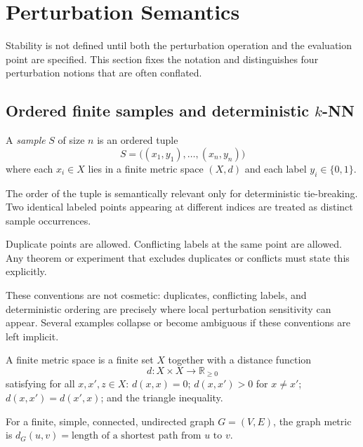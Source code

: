 \section{Perturbation Semantics}
\label{sec:perturbation-semantics}

Stability is not defined until both the perturbation operation and the
evaluation point are specified.  This section fixes the notation and
distinguishes four perturbation notions that are often conflated.

\subsection{Ordered finite samples and deterministic $k$-NN}

\begin{definition}[Sample]
A \emph{sample} $S$ of size $n$ is an ordered tuple
\[
S = \big((x_1, y_1), \ldots, (x_n, y_n)\big)
\]
where each $x_i \in X$ lies in a finite metric space $(X, d)$ and each label
$y_i \in \{0, 1\}$.
\end{definition}

The order of the tuple is semantically relevant only for deterministic
tie-breaking.  Two identical labeled points appearing at different indices are
treated as distinct sample occurrences.

\begin{note}
Duplicate points are allowed.  Conflicting labels at the same point are
allowed.  Any theorem or experiment that excludes duplicates or conflicts must
state this explicitly.
\end{note}

These conventions are not cosmetic: duplicates, conflicting labels, and
deterministic ordering are precisely where local perturbation sensitivity can
appear.  Several examples collapse or become ambiguous if these conventions are
left implicit.

\begin{definition}
A finite metric space is a finite set $X$ together with a distance function
\[
d : X \times X \to \mathbb{R}_{\ge 0}
\]
satisfying for all $x, x', z \in X$: $d(x, x) = 0$; $d(x, x') > 0$ for
$x \ne x'$; $d(x, x') = d(x', x)$; and the triangle inequality.
\end{definition}

\begin{definition}
For a finite, simple, connected, undirected graph $G = (V, E)$, the graph
metric is $d_G(u, v) = \text{length of a shortest path from } u \text{ to } v$.
\end{definition}

